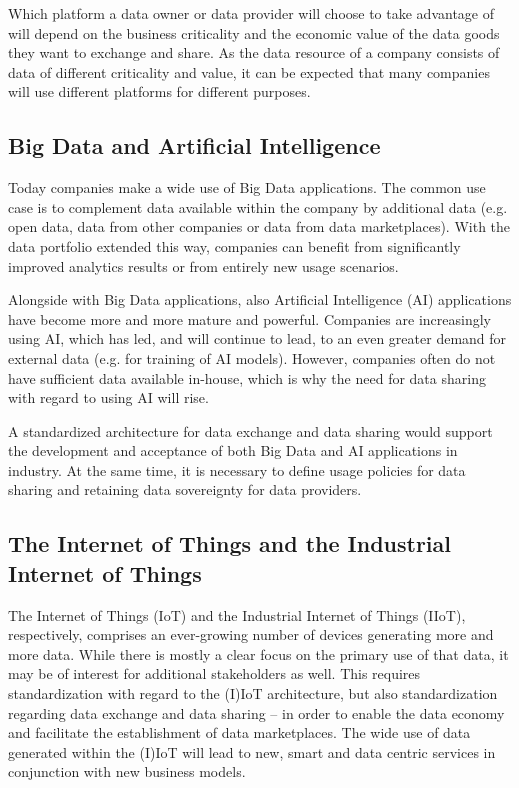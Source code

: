 Which platform a data owner or data provider will choose to take advantage of will depend on the business criticality and the economic value of the data goods they want to exchange and share. As the data resource of a company consists of data of different criticality and value, it can be expected that many companies will use different platforms for different purposes.

\subsection{Big Data and Artificial Intelligence}\label{subsec:bigdata_ai}
Today companies make a wide use of Big Data applications. The common use case is to complement data available within the company by additional data (e.g. open data, data from other companies or data from data marketplaces). With the data portfolio extended this way, companies can benefit from significantly improved analytics results or from entirely new usage scenarios. 

Alongside with Big Data applications, also Artificial Intelligence (AI) applications have become more and more mature and powerful. Companies are increasingly using AI, which has led, and will continue to lead, to an even greater demand for external data (e.g. for training of AI models). However, companies often do not have sufficient data available in-house, which is why the need for data sharing with regard to using AI will rise.   

A standardized architecture for data exchange and data sharing would support the development and acceptance of both Big Data and AI applications in industry. At the same time, it is necessary to define usage policies for data sharing and retaining data sovereignty for data providers. 



\subsection{The Internet of Things and the Industrial Internet of Things}\label{subsec:iiot}
The Internet of Things (IoT) and the Industrial Internet of Things (IIoT), respectively, comprises an ever-growing number of devices generating more and more data. While there is mostly a clear focus on the primary use of that data, it may be of interest for additional stakeholders as well. This requires standardization with regard to the (I)IoT architecture, but also standardization regarding data exchange and data sharing – in order to enable the data economy and facilitate the establishment of data marketplaces. The wide use of data generated within the (I)IoT will lead to new, smart and data centric services in conjunction with new business models.

